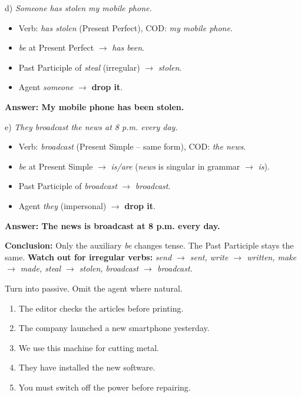 \documentclass[11pt]{article}
\begin{document}
\begin{exoresolu}
d) \emph{Someone has stolen my mobile phone.}
\begin{itemize}
\item Verb: \emph{has stolen} (Present Perfect), COD: \emph{my mobile phone}.
\item \emph{be} at Present Perfect $\rightarrow$ \emph{has been}.
\item Past Participle of \emph{steal} (irregular) $\rightarrow$ \emph{stolen}.
\item Agent \emph{someone} $\rightarrow$ \textbf{drop it}.
\end{itemize}
\textbf{Answer: My mobile phone has been stolen.}

e) \emph{They broadcast the news at 8 p.m. every day.}
\begin{itemize}
\item Verb: \emph{broadcast} (Present Simple -- same form), COD: \emph{the news}.
\item \emph{be} at Present Simple $\rightarrow$ \emph{is/are} (\emph{news} is singular in grammar $\rightarrow$ \emph{is}).
\item Past Participle of \emph{broadcast} $\rightarrow$ \emph{broadcast}.
\item Agent \emph{they} (impersonal) $\rightarrow$ \textbf{drop it}.
\end{itemize}
\textbf{Answer: The news is broadcast at 8 p.m. every day.}

\textbf{Conclusion:} Only the auxiliary \emph{be} changes tense. The Past Participle stays the same. \textbf{Watch out for irregular verbs:} \emph{send $\rightarrow$ sent, write $\rightarrow$ written, make $\rightarrow$ made, steal $\rightarrow$ stolen, broadcast $\rightarrow$ broadcast.}
\end{exoresolu}

\begin{exercice}
Turn into passive. Omit the agent where natural.
\begin{enumerate}
\item The editor checks the articles before printing.
\item The company launched a new smartphone yesterday.
\item We use this machine for cutting metal.
\item They have installed the new software.
\item You must switch off the power before repairing.
\end{enumerate}
\end{exercice}
\end{document}
